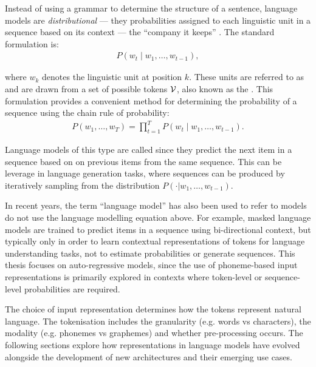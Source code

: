 
Instead of using a grammar to determine the structure of a sentence, language models are \emph{distributional} --- they probabilities assigned to each linguistic unit in a sequence based on its context --- the ``company it keeps'' \citep{firth1957synopsis}. The standard formulation is:
\begin{align}
    P\left(w_t \mid w_1, \dots, w_{t-1} \right), \label{eq:languagemodel}
\end{align}

where $w_k$ denotes the linguistic unit at position $k$. These units are referred to as  and are drawn from a set of possible tokens $\mathcal{V}$, also known as the . This formulation provides a convenient method for determining the probability of a sequence using the chain rule of probability:
\begin{align}
    P(w_1, \dots, w_T) = \prod_{t=1}^{T} P\left(w_t \mid w_1, \dots, w_{t-1}\right).
\end{align}


Language models of this type are called  since they predict the next item in a sequence based on on previous items from the same sequence. This can be leverage in language generation tasks, where sequences can be produced by iteratively sampling from the distribution $P(\cdot | w_1, \dots, w_{t-1})$.


In recent years, the term ``language model'' has also been used to refer to models do not use the language modelling equation above. For example, masked language models \citep[MLM;][]{devlin2019bert} are trained to predict items in a sequence using bi-directional context, but typically only in order to learn contextual representations of tokens for language understanding tasks, not to estimate probabilities or generate sequences. This thesis focuses on auto-regressive models, since the use of phoneme-based input representations is primarily explored in contexts where token-level or sequence-level probabilities are required.

The choice of input representation determines how the tokens represent natural language. The tokenisation includes the granularity (e.g. words vs characters), the modality (e.g. phonemes vs graphemes) and whether pre-processing occurs. The following sections explore how representations in language models have evolved alongside the development of new architectures and their emerging use cases.

